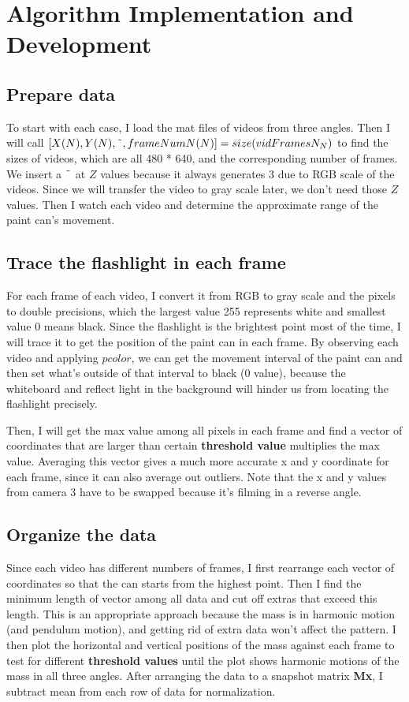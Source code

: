 \documentclass[10pt]{article}
\begin{document}
\section{Algorithm Implementation and Development}
\subsection*{Prepare data}
To start with each case, I load the mat files of videos from three angles. Then I will call $[X(N), Y(N), \char`\~, frameNumN(N)] = size(vidFramesN_N)$ to find the sizes of videos, which are all 480 * 640, and the corresponding number of frames. We insert a $\char`\~$ at $Z$ values because it always generates 3 due to RGB scale of the videos. Since we will transfer the video to gray scale later, we don't need those $Z$ values. Then I watch each video and determine the approximate range of the paint can's movement.

\subsection*{Trace the flashlight in each frame}
For each frame of each video, I convert it from RGB to gray scale and the pixels to double precisions, which the largest value 255 represents white and smallest value 0 means black. Since the flashlight is the brightest point most of the time, I will trace it to get the position of the paint can in each frame. By observing each video and applying $pcolor$, we can get the movement interval of the paint can and then set what's outside of that interval to black (0 value), because the whiteboard and reflect light in the background will hinder us from locating the flashlight precisely. 
\par
\vskip 0.1cm
Then, I will get the max value among all pixels in each frame and find a vector of coordinates that are larger than certain \textbf{threshold value} multiplies the max value. Averaging this vector gives a much more accurate x and y coordinate for each frame, since it can also average out outliers. Note that the x and y values from camera 3 have to be swapped because it's filming in a reverse angle.

\subsection*{Organize the data}
Since each video has different numbers of frames, I first rearrange each vector of coordinates so that the can starts from the highest point. Then I find the minimum length of vector among all data and cut off extras that exceed this length. This is an appropriate approach because the mass is in harmonic motion (and pendulum motion), and getting rid of extra data won't affect the pattern. I then plot the horizontal and vertical positions of the mass against each frame to test for different \textbf{threshold values} until the plot shows harmonic motions of the mass in all three angles. After arranging the data to a snapshot matrix \textbf{Mx}, I subtract mean from each row of data for normalization.
\end{document}
